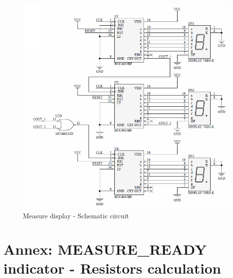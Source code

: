 \begin{figure}[H]
    \begin{centering}
    \includegraphics[width=1\textwidth]{Display}
    \par\end{centering}
    \caption{Measure display - Schematic circuit}
\end{figure}

\newpage 
\section*{Annex: MEASURE\_READY indicator - Resistors calculation}

